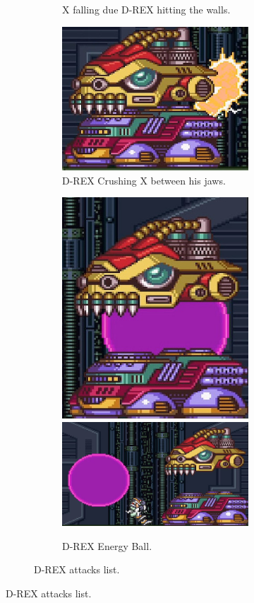 \begin{figure}[htp]
\begin{figure}[htp]
\begin{subfigure}[t]{0.40\linewidth}
		\caption{X falling due D-REX hitting the walls.}
	\end{subfigure}
	\begin{subfigure}[t]{0.50\linewidth}
		\centering
		\includegraphics[width=\linewidth]{figures/X1/Sigma_stages/Drex_crush.jpg}
		\caption{D-REX Crushing X between his jaws.}
	\end{subfigure}
	\begin{subfigure}{\linewidth}
		\centering
		\includegraphics[width=0.26\linewidth]{figures/X1/Sigma_stages/Drex_laser_1.jpg}
		\includegraphics[width=0.55\linewidth]{figures/X1/Sigma_stages/Drex_laser_2.jpg}
		\caption{D-REX Energy Ball.}
	\end{subfigure}
	\caption{D-REX attacks list.}
\end{figure} 



\end{figure}
